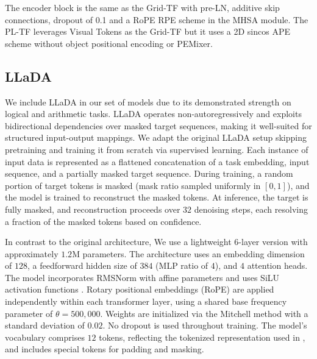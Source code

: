 The encoder block is the same as the Grid-TF with pre-LN, additive skip connections, dropout of 0.1 and a RoPE RPE scheme in the MHSA module. The PL-TF leverages Visual Tokens as the Grid-TF but it uses a 2D sincos APE scheme without object positional encoding or PEMixer.


\subsection{LLaDA} \label{sec:llada_model_details_appendix}
We include LLaDA \citep{Nie_LLaDA_2025} in our set of models due to its demonstrated strength on logical and arithmetic tasks. LLaDA operates non-autoregressively and exploits bidirectional dependencies over masked target sequences, making it well-suited for structured input-output mappings. We adapt the original LLaDA setup skipping pretraining and training it from scratch via supervised learning. Each instance of input data is represented as a flattened concatenation of a task embedding, input sequence, and a partially masked target sequence. During training, a random portion of target tokens is masked (mask ratio sampled uniformly in $[0,1]$), and the model is trained to reconstruct the masked tokens. At inference, the target is fully masked, and reconstruction proceeds over $32$ denoising steps, each resolving a fraction of the masked tokens based on confidence.

In contrast to the original architecture, We use a lightweight $6$-layer version with approximately $1.2$M parameters. The architecture uses an embedding dimension of $128$, a feedforward hidden size of $384$ (MLP ratio of $4$), and $4$ attention heads. The model incorporates RMSNorm \citep{Zhang_Sennrich_2019} with affine parameters and uses SiLU activation functions \citep{Elfwing_SiLU_2018}. Rotary positional embeddings (RoPE) \citep{Su_RoFormer_2024} are applied independently within each transformer layer, using a shared base frequency parameter of $\theta = 500{,}000$. Weights are initialized via the Mitchell method with a standard deviation of $0.02$. No dropout is used throughout training.
The model's vocabulary comprises $12$ tokens, reflecting the tokenized representation used in \generatorName, and includes special tokens for padding and masking.